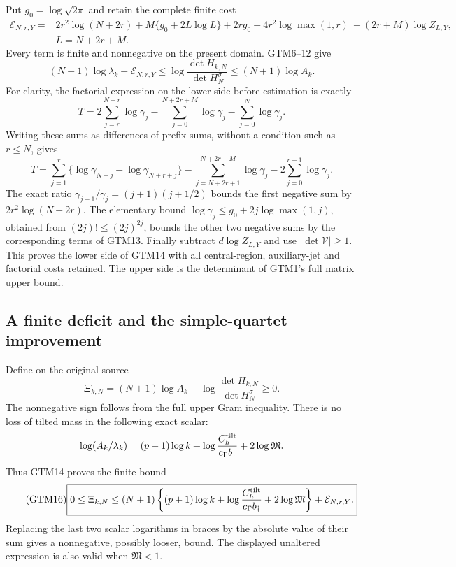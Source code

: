 Put $g_0=\log\sqrt{2\pi}$ and retain the complete finite cost
\begin{equation}\tag{GTM13}
 \begin{aligned}
 \mathcal E_{N,r,Y}={}&2r^2\log(N+2r)
 +M\{g_0+2L\log L\}+2rg_0
 +4r^2\log\max(1,r)\ + (2r+M)\log Z_{L,Y},\\
 & L=N+2r+M.
 \end{aligned}
\end{equation}
Every term is finite and nonnegative on the present domain.
GTM6--12 give
\begin{equation}\tag{GTM14}
 \boxed{(N+1)\log\lambda_k-\mathcal E_{N,r,Y}
 \le\log\frac{\det H_{k,N}}{\det H_N^\sigma}
 \le(N+1)\log A_k.}
\end{equation}
For clarity, the factorial expression on the lower side before
estimation is exactly
\[
 T=2\sum_{j=r}^{N+r}\log\gamma_j
 -\sum_{j=0}^{N+2r+M}\log\gamma_j-\sum_{j=0}^N\log\gamma_j.
\]
Writing these sums as differences of prefix sums, without a condition
such as $r\le N$, gives
\[
 T=\sum_{j=1}^r\{\log\gamma_{N+j}-\log\gamma_{N+r+j}\}
 -\sum_{j=N+2r+1}^{N+2r+M}\log\gamma_j
 -2\sum_{j=0}^{r-1}\log\gamma_j.
\]
The exact ratio $\gamma_{j+1}/\gamma_j=(j+1)(j+1/2)$ bounds
the first negative sum by $2r^2\log(N+2r)$.
The elementary bound
$\log\gamma_j\le g_0+2j\log\max(1,j)$, obtained from
$(2j)!\le(2j)^{2j}$, bounds the other two negative sums by
the corresponding terms of GTM13.  Finally subtract
$d\log Z_{L,Y}$ and use $|\det\mathcal V|\ge1$.
This proves the lower side of GTM14 with all central-region,
auxiliary-jet and factorial costs retained.  The upper side is
the determinant of GTM1's full matrix upper bound.

\subsection{A finite deficit and the simple-quartet improvement}

Define on the original source
\begin{equation}\tag{GTM15}
 \Xi_{k,N}=(N+1)\log A_k
       -\log\frac{\det H_{k,N}}{\det H_N^\sigma}\ge0.
\end{equation}
The nonnegative sign follows from the full upper Gram inequality.
There is no loss of tilted mass in the following exact scalar:
\[
 \log(A_k/\lambda_k)
 =(p+1)\log k+\log\frac{C_h^{\rm tilt}}{c_\Gamma b_\dagger}
                  +2\log\mathfrak M.
\]
Thus GTM14 proves the finite bound
\begin{equation}\tag{GTM16}
 \boxed{0\le\Xi_{k,N}\le
 (N+1)\left\{(p+1)\log k
       +\log\frac{C_h^{\rm tilt}}{c_\Gamma b_\dagger}
       +2\log\mathfrak M\right\}+\mathcal E_{N,r,Y}.}
\end{equation}
Replacing the last two scalar logarithms in braces by the absolute
value of their sum gives a nonnegative, possibly looser, bound.
The displayed unaltered expression is also valid when
$\mathfrak M<1$.

